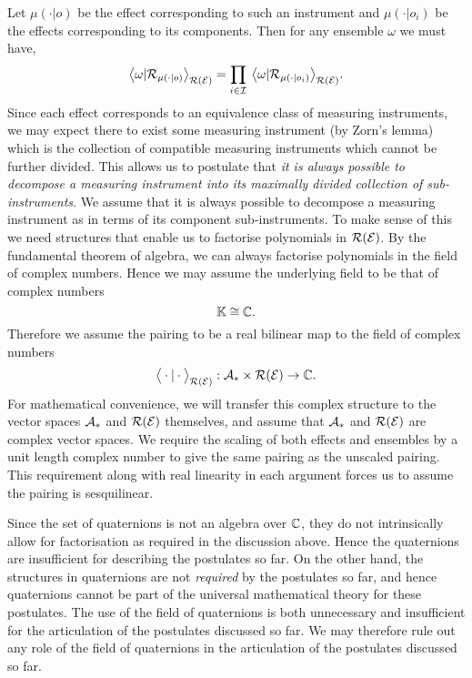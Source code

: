 \documentclass[11pt]{article}
\begin{document}
Let $\mu(\cdot|o)$ be the effect corresponding to such an instrument and $\mu(\cdot|o_i)$ be the effects corresponding to its components. Then for any ensemble $\omega$ we must have,
$$\big\langle \omega|\mathcal{R}_{\mu(\cdot|o)}\big\rangle_{\mathcal{R}(\mathcal{E})}=\prod_{i\in \mathcal{I}}\:\big\langle \omega|\mathcal{R}_{\mu(\cdot|o_i)}\big\rangle_{\mathcal{R}(\mathcal{E})}.$$
Since each effect corresponds to an equivalence class of measuring instruments, we may expect there to exist some measuring instrument (by Zorn's lemma) which is the collection of compatible measuring instruments which cannot be further divided. This allows us to postulate that \emph{it is always possible to decompose a measuring instrument into its maximally divided collection of sub-instruments}. We assume that it is always possible to decompose a measuring instrument as in terms of its component sub-instruments. To make sense of this we need structures that enable us to factorise polynomials in $\mathcal{R}(\mathcal{E})$. By the fundamental theorem of algebra, we can always factorise polynomials in the field of complex numbers. Hence we may assume the underlying field to be that of complex numbers
$$\mathbb{K}\cong \mathbb{C}.$$
Therefore we assume the pairing to be a real bilinear map to the field of complex numbers
$$\big\langle \cdot|\cdot\big\rangle_{\mathcal{R}(\mathcal{E})} :\mathcal{A}_* \times \mathcal{R}(\mathcal{E})\to \mathbb{C}.$$
For mathematical convenience, we will transfer this complex structure to the vector spaces $\mathcal{A}_* $ and $\mathcal{R}(\mathcal{E})$ themselves, and assume that $\mathcal{A}_* $ and $\mathcal{R}(\mathcal{E})$ are complex vector spaces. We require the scaling of both effects and ensembles by a unit length complex number to give the same pairing as the unscaled pairing. This requirement along with real linearity in each argument forces us to assume the pairing is sesquilinear.

\noindent Since the set of quaternions is not an algebra over $\mathbb{C}$, they do not intrinsically allow for factorisation as required in the discussion above. Hence the quaternions are insufficient for describing the postulates so far. On the other hand, the structures in quaternions are not \emph{required} by the postulates so far, and hence quaternions cannot be part of the universal mathematical theory for these postulates. The use of the field of quaternions is both unnecessary and insufficient for the articulation of the postulates discussed so far. We may therefore rule out any role of the field of quaternions in the articulation of the postulates discussed so far.
\end{document}
